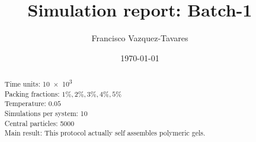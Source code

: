 \documentclass[a4paper]{tufte-handout} %
\title{Simulation report: Batch-1}
\author{Francisco Vazquez-Tavares}
\date{\today} %
\begin{document}
\maketitle %


\begin{abstract}
Time units: \num{10e3} \\
Packing fractions: $1\%,2\%,3\%,4\%,5\%$ \\
Temperature: $0.05$\\
Simulations per system: 10 \\
Central particles: \num{5000} \\

Main result: This protocol actually self assembles polymeric gels.
\end{abstract}


\justifying


\end{document}

